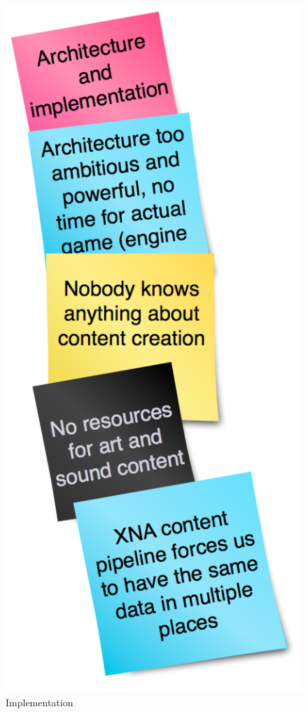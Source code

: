 \documentclass[titlepage,a4paper,11pt]{article}
\begin{document}
\begin{figure}[H]
    \hspace{0.5cm}
    \begin{minipage}[b]{0.5\linewidth}
        \centering
\includegraphics[scale=0.4]{graphics/postit/NEG_architecture_implementation}
        \caption{Implementation}
        \label{fig:neg4}
    \end{minipage}
\end{figure}
\end{document}
